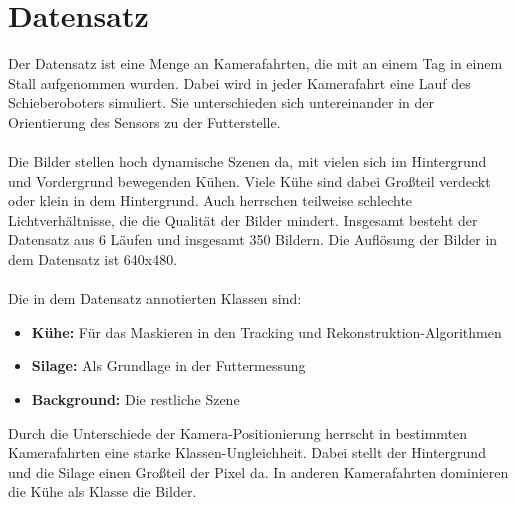 \documentclass[12pt,DIV=15,BCOR=15mm,twoside,headsepline,abstract=true,listof=totoc,bibliography=totoc]{scrreprt}
\theoremstyle{remark}    %
\begin{document}
    \section{Datensatz}
    Der Datensatz ist eine Menge an Kamerafahrten, die mit an einem Tag in einem Stall aufgenommen wurden. Dabei wird in jeder Kamerafahrt eine Lauf des 
    Schieberoboters simuliert. Sie unterschieden sich untereinander in der Orientierung des Sensors zu der Futterstelle.\\\\
    Die Bilder stellen hoch dynamische Szenen da, mit vielen sich im Hintergrund und Vordergrund bewegenden Kühen. Viele Kühe sind dabei Großteil verdeckt oder 
    klein in dem Hintergrund. Auch herrschen teilweise schlechte Lichtverhältnisse, die die Qualität der Bilder mindert.
    Insgesamt besteht der Datensatz aus 6 Läufen und insgesamt 350 Bildern. Die Auflösung der Bilder in dem Datensatz ist 640x480.\\\\ 
    Die in dem Datensatz annotierten Klassen sind:
    \begin{itemize}
        \item \textbf{Kühe:} Für das Maskieren in den Tracking und Rekonstruktion-Algorithmen
        \item \textbf{Silage:} Als Grundlage in der Futtermessung
        \item \textbf{Background:} Die restliche Szene
    \end{itemize}\noindent
    Durch die Unterschiede der Kamera-Positionierung herrscht in bestimmten Kamerafahrten eine starke Klassen-Ungleichheit. Dabei stellt der Hintergrund und die Silage
    einen Großteil der Pixel da. In anderen Kamerafahrten dominieren die Kühe als Klasse die Bilder.
\end{document}
